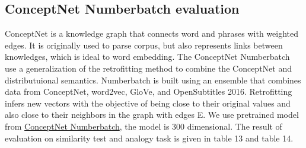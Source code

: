 \documentclass[a4paper, 11pt]{article}
\begin{document}
\subsection{ConceptNet Numberbatch evaluation}
ConceptNet is a knowledge graph that connects word and phrases with weighted edges. It is originally used to parse corpus, but also represents links between knowledges, which is ideal to word embedding. The ConceptNet Numberbatch use a generalization of the retrofitting method to combine the ConceptNet and distributuional semantics. Numberbatch is built using an ensemble that combines data from ConceptNet, word2vec, GloVe, and OpenSubtitles 2016. Retrofitting infers new vectors with the objective of being close to their original values and also close to their neighbors in the graph with edges E. We use pretrained model from \href{https://github.com/commonsense/conceptnet-numberbatch}{ConceptNet Numberbatch}, the model is 300 dimensional. The result of evaluation on similarity test and analogy task is given in table 13 and table 14.
\begin{table}[ht!]
\centering
{}
\caption{Similarity result of ConceptNet Numberbatch}
\label{tab:my-table}
\end{table}
\begin{table}[ht!]
\centering
{}
\caption{Analogy tasks on ConceptNet Numberbatch }
\label{tab:my-table}
\end{table}
\end{document}
